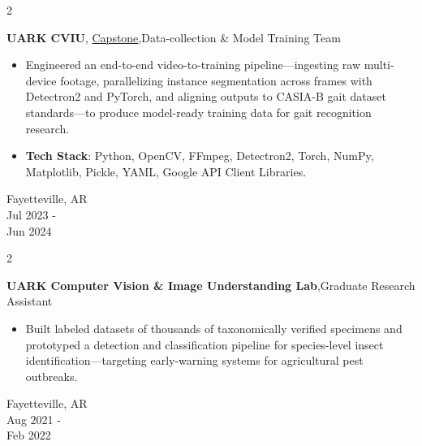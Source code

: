 \documentclass[10pt, letterpaper]{article}
\newenvironment{highlights}{
    \begin{itemize}[
        topsep=0.10 cm,
        parsep=0.10 cm,
        partopsep=0pt,
        itemsep=0pt,
        leftmargin=0.4 cm + 10pt
    ]
}{
    \end{itemize}
} %
\newenvironment{twocolentry}[2][]{
    \onecolentry
    \def\secondColumn{#2}
    \setcolumnwidth{\fill,4 cm}
    \begin{paracol}{2}
}{
    \switchcolumn \raggedleft \secondColumn
    \end{paracol}
    \endonecolentry
} %
\let\hrefWithoutArrow\href
\renewcommand{\href}[2]{\hrefWithoutArrow{#1}{\ifthenelse{\equal{#2}{}}{ }{#2 }\raisebox{.15ex}{\footnotesize \faExternalLink*}}}
\begin{document}
        \begin{twocolentry}{
            Fayetteville, AR\\
            Jul 2023 - \\Jun 2024
        }
            \textbf{UARK CVIU},
            \mbox{\hrefWithoutArrow{https://github.com/trqminh/OpenGait-Capstone/tree/main}{{\footnotesize\faGithub}\hspace*{0.11cm}Capstone}},\;Data-collection \& Model Training Team
            \begin{highlights}
                \item Engineered an end-to-end video-to-training pipeline—ingesting raw multi-device footage, parallelizing instance segmentation across frames with Detectron2 and PyTorch, and aligning outputs to CASIA-B gait dataset standards—to produce model-ready training data for gait recognition research.
                \item \textbf{Tech Stack}: Python, OpenCV, FFmpeg, Detectron2, Torch, NumPy, Matplotlib, Pickle, YAML, Google API Client Libraries.
            \end{highlights}
        \end{twocolentry}
        \begin{twocolentry}{
            Fayetteville, AR\\
            Aug 2021 - \\Feb 2022 
        }
            \textbf{UARK Computer Vision \& Image Understanding Lab},\;Graduate Research Assistant
            \begin{highlights}
                \item Built labeled datasets of thousands of taxonomically verified specimens and prototyped a detection and classification pipeline for species-level insect identification—targeting early-warning systems for agricultural pest outbreaks.
            \end{highlights}
        \end{twocolentry}
\end{document}
